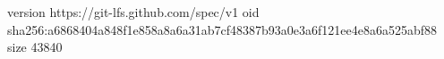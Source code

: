 version https://git-lfs.github.com/spec/v1
oid sha256:a6868404a848f1e858a8a6a31ab7cf48387b93a0e3a6f121ee4e8a6a525abf88
size 43840
